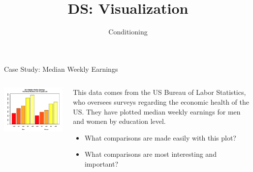 \documentclass[aspectratio=169]{../latex_main/tntbeamer}  %
\title[Visualization]{DS: Visualization}
\subtitle{Conditioning}
\begin{document}
	
	\maketitle
	\begin{frame}{Case Study: Median Weekly Earnings}
	    \begin{columns}
	        \begin{column}{.45\textwidth}
	        
	                    \centering
	                    \includegraphics[scale=.65]{Bild55}

	        \end{column}
	        
	        
	        \begin{column}{.55\textwidth}
	        
	                This data comes from the US Bureau of Labor Statistics, who oversees surveys regarding the economic health of the US. They have plotted median weekly earnings for men and women by education level.
	                \begin{itemize}
	                    \item What comparisons are made easily with this plot?
	                    \item What comparisons are most interesting and important?
	                \end{itemize}
	                
	        \end{column}
	    \end{columns}
	\end{frame}
	
\end{document}
